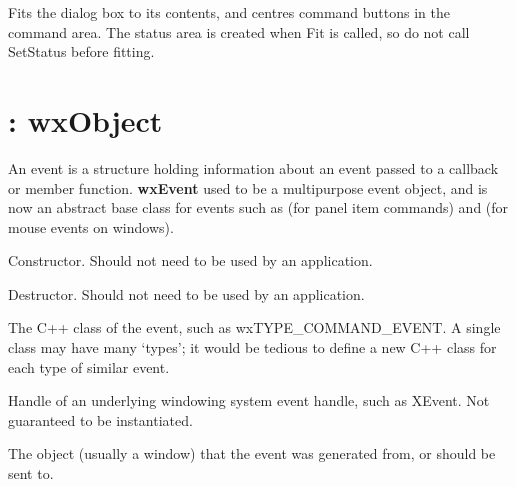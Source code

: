 \label{wxenhdialogfit}


Fits the dialog box to its contents, and centres command buttons in the
command area. The status area is created when Fit is called, so do not
call SetStatus before fitting.

\section{: wxObject}\label{wxevent}

An event is a structure holding information about an event passed to a
callback or member function. {\bf wxEvent} used to be a multipurpose
event object, and is now an abstract base class for events such
as  (for panel item commands)
and  (for mouse events on windows).



Constructor. Should not need to be used by an application.



Destructor. Should not need to be used by an application.



The C++ class of the event, such as wxTYPE\_COMMAND\_EVENT.
A single class may have many `types'; it would be tedious to define
a new C++ class for each type of similar event.



Handle of an underlying windowing system event handle, such as
XEvent. Not guaranteed to be instantiated.



The object (usually a window) that the event was generated from,
or should be sent to.



